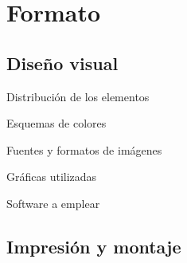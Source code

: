 \documentclass[xcolor=svgnames,compress]{beamer}
\begin{document}
\section{Formato}

\subsection{Diseño visual}

\begin{frame}{Distribución de los elementos}

\end{frame}

\begin{frame}{Esquemas de colores}

\end{frame}

\begin{frame}{Fuentes y formatos de imágenes}

\end{frame}

\begin{frame}{Gráficas utilizadas}

\end{frame}

\begin{frame}{Software a emplear}

\end{frame}

\subsection{Impresión y montaje}
\end{document}
